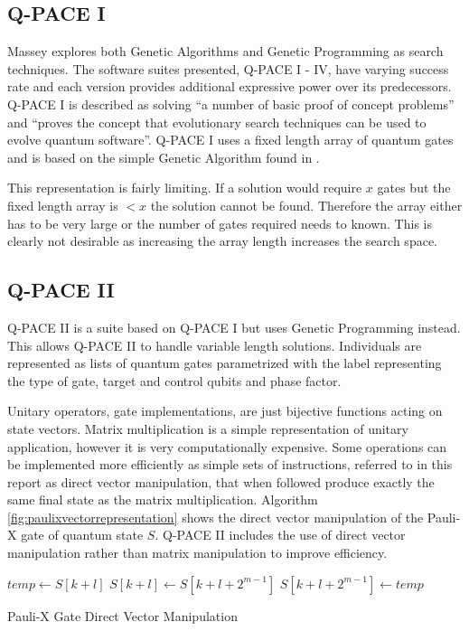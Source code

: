 \subsection{Q-PACE I}
Massey\cite{masseythesis,masseymeng} explores both Genetic Algorithms and Genetic Programming as search techniques.
The software suites presented, Q-PACE I - IV, have varying success rate and each version provides additional expressive power over its predecessors.
Q-PACE I\cite{masseymeng} is described as solving ``a number of basic proof of concept problems''\cite{masseythesis} and ``proves the concept that evolutionary search techniques can be used to evolve quantum software''\cite{masseythesis}.
Q-PACE I uses a fixed length array of quantum gates and is based on the simple Genetic Algorithm found in \cite{1989goldberg}.

This representation is fairly limiting.
If a solution would require $x$ gates but the fixed length array is $<x$ the solution cannot be found.
Therefore the array either has to be very large or the number of gates required needs to known.
This is clearly not desirable as increasing the array length increases the search space.

\subsection{Q-PACE II}
Q-PACE II\cite{masseythesis} is a suite based on Q-PACE I but uses Genetic Programming instead.
This allows Q-PACE II to handle variable length solutions. 
Individuals are represented as lists of quantum gates parametrized with the label representing the type of gate, target and control qubits and phase factor.

Unitary operators, gate implementations, are just bijective functions acting on state vectors.
Matrix multiplication is a simple representation of unitary application, however it is very computationally expensive.
Some operations can be implemented more efficiently as simple sets of instructions, referred to in this report as direct vector manipulation, that when followed produce exactly the same final state as the matrix multiplication.
Algorithm \ref{fig:paulixvectorrepresentation} shows the direct vector manipulation of the Pauli-X gate of quantum state $S$.
Q-PACE II includes the use of direct vector manipulation rather than matrix manipulation to improve efficiency.
\begin{algorithm}
\begin{algorithmic}
\STATE $temp \gets S[k+l]$
\STATE $S[k+l] \gets S[k+l+2^{m-1}]$
\STATE $S[k+l+2^{m-1}] \gets temp$
\ENDFOR
\ENDFOR
\end{algorithmic}
\caption{Pauli-X Gate Direct Vector Manipulation}
\label{fig:paulixvectorrepresentation}
\end{algorithm}

